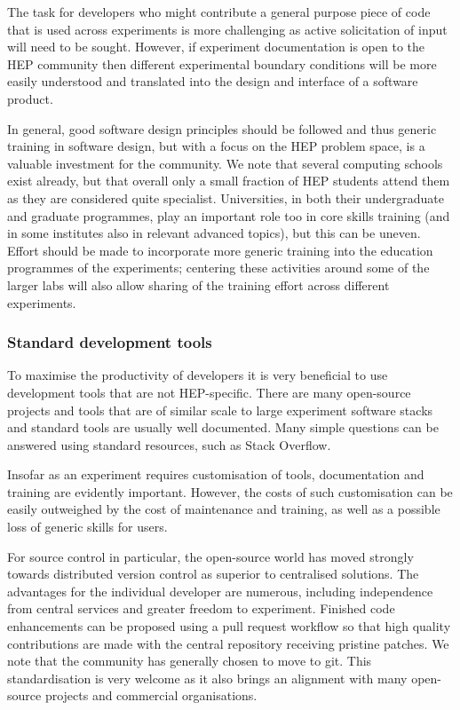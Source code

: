 \documentclass[12pt,a4paper]{article}
\begin{document}
The task for developers who might contribute a general purpose piece of
code that is used across experiments is more challenging as active
solicitation of input will need to be sought. However, if experiment
documentation is open to the HEP community then different experimental
boundary conditions will be more easily understood and translated into
the design and interface of a software product.

In general, good software design principles should be followed and thus
generic training in software design, but with a focus on the HEP problem
space, is a valuable investment for the community. We note that several
computing schools exist already, but that overall only a small fraction of
HEP students attend them as they are considered quite specialist.
Universities, in both their undergraduate and graduate programmes, play an
important role too in core skills training (and in some institutes also
in relevant advanced topics), but this can be uneven. Effort should be
made to incorporate more generic training into the education programmes of
the experiments; centering these activities around some of the larger
labs will also allow sharing of the training effort across different
experiments.

\hypertarget{standard-development-tools}{%
\subsubsection{Standard development
tools}\label{standard-development-tools}}

To maximise the productivity of developers it is very beneficial to use
development tools that are not HEP-specific. There are many open-source
projects and tools that are of similar scale to large experiment
software stacks and standard tools are usually well documented. Many
simple questions can be answered using standard resources, such as Stack
Overflow.

Insofar as an experiment requires customisation of tools, documentation
and training are evidently important. However, the costs of such
customisation can be easily outweighed by the cost of maintenance and
training, as well as a possible loss of generic skills for users.

For source control in particular, the open-source world has moved
strongly towards distributed version control as superior to centralised
solutions. The advantages for the individual developer are numerous,
including independence from central services and greater freedom to
experiment. Finished code enhancements can be proposed using a
pull request workflow so that high quality contributions are made with
the central repository receiving pristine patches. We note that the
community has generally chosen to move to git. This standardisation
is very welcome as it also brings an alignment with many open-source
projects and commercial organisations.
\end{document}
